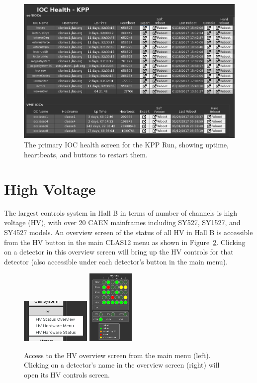 \documentclass[amsmath,amssymb,notitlepage,11pt]{revtex4}
\begin{document}
\begin{figure}[htbp]\centering
  \includegraphics[width=\textwidth]{pics/iochealth-KPP}
  \caption{The primary IOC health screen for the KPP Run, showing uptime, heartbeats, and buttons to restart them.  \label{fig:iochealth}}
\end{figure}

\section{High Voltage}
The largest controls system in Hall B in terms of number of channels is high voltage (HV), with over 20 CAEN mainframes including SY527, SY1527, and SY4527 models.  An overview screen of the status of all HV in Hall B is accessible from the HV button in the main CLAS12 menu as shown in Figure~\ref{fig:hv}.  Clicking on a detector in this overview screen will bring up the HV controls for that detector (also accessible under each detector's button in the main menu).

\begin{figure}[htbp]\centering
  \includegraphics[width=0.3\textwidth]{pics/hvmenu}
  \includegraphics[width=0.2\textwidth]{pics/hvstat}
  \caption{Access to the HV overview screen from the main menu (left).  Clicking on a detector's name in the overview screen (right) will open its HV controls screen.\label{fig:hv}}
\end{figure}
\end{document}

